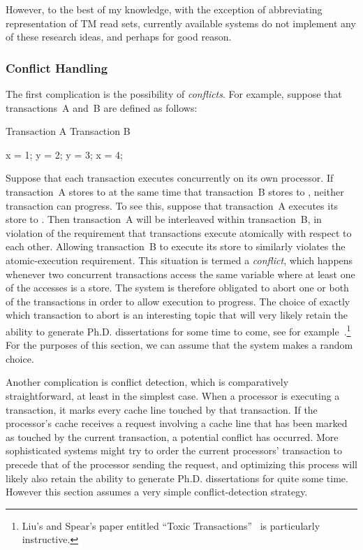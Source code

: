 However, to the best of my knowledge, with the exception of abbreviating
representation of TM read sets, currently available systems do not
implement any of these research ideas, and perhaps for good reason.

\subsubsection{Conflict Handling}
\label{sec:future:Conflict Handling}

The first complication is the possibility of \emph{conflicts}.
For example, suppose that transactions~A and~B are defined as follows:

\begin{VerbatimU}
Transaction A       Transaction B

x = 1;              y = 2;
y = 3;              x = 4;
\end{VerbatimU}

Suppose that each transaction executes concurrently on its own processor.
If transaction~A stores to  at the same time that transaction~B
stores to , neither transaction can progress.
To see this, suppose that transaction~A executes its store to .
Then transaction~A will be interleaved within transaction~B, in violation
of the requirement that transactions execute atomically with respect to
each other.
Allowing transaction~B to execute its store to  similarly violates
the atomic-execution requirement.
This situation is termed a \emph{conflict}, which happens whenever two
concurrent transactions access the same variable where at least one of
the accesses is a store.
The system is therefore obligated to abort one or both of the transactions
in order to allow execution to progress.
The choice of exactly which transaction to abort is an interesting topic
that will very likely retain the ability to generate Ph.D. dissertations for
some time to come, see for
example~\cite{EgeAkpinar2011HTM2TLE}.\footnote{
	Liu's and Spear's paper entitled ``Toxic
	Transactions''~\cite{YujieLiu2011ToxicTransactions} is
	particularly instructive.}
For the purposes of this section, we can assume that the system makes
a random choice.

Another complication is conflict detection, which is comparatively
straightforward, at least in the simplest case.
When a processor is executing a transaction, it marks every cache line
touched by that transaction.
If the processor's cache receives a request involving a cache line that
has been marked as touched by the current transaction, a potential
conflict has occurred.
More sophisticated systems might try to order the current processors'
transaction to precede that of the processor sending the request, and
optimizing this process will likely also retain the ability to generate
Ph.D. dissertations for quite some time.
However this section assumes a very simple conflict-detection strategy.

